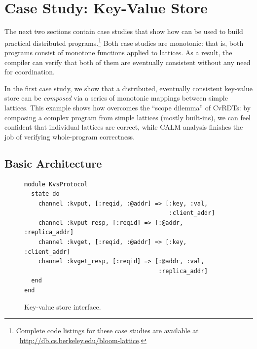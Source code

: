 \section{Case Study: Key-Value Store}
\label{sec:kvs}
The next two sections contain case studies that show how \lang can be used to
build practical distributed programs.\footnote{Complete code listings for these
  case studies are available at \mbox{\small
    \url{http://db.cs.berkeley.edu/bloom-lattice}}.} Both case studies are
monotonic: that is, both programs consist of monotone functions applied to
lattices. As a result, the \lang compiler can verify that both of them are
eventually consistent without any need for coordination.

In the first case study, we show that a distributed, eventually consistent
key-value store can be \emph{composed} via a series of monotonic mappings
between simple lattices. This example shows how \lang overcomes
the ``scope dilemma'' of CvRDTs: by composing a complex program from simple
lattices (mostly \lang built-ins), we can feel confident that individual
lattices are correct, while CALM analysis finishes the job of verifying
whole-program correctness.




\subsection{Basic Architecture}
\begin{figure}[t]
\begin{scriptsize}
\begin{lstlisting}
module KvsProtocol
  state do
    channel :kvput, [:reqid, :@addr] => [:key, :val,
                                         :client_addr]
    channel :kvput_resp, [:reqid] => [:@addr, :replica_addr]
    channel :kvget, [:reqid, :@addr] => [:key, :client_addr]
    channel :kvget_resp, [:reqid] => [:@addr, :val,
                                      :replica_addr]
  end
end
\end{lstlisting}
\end{scriptsize}
\caption{Key-value store interface.}
\label{fig:kvs-interface}
\end{figure}

